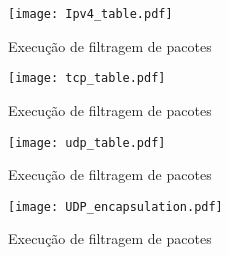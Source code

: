 \begin{figure}[ht]
\centering
\texttt{[image: Ipv4\_table.pdf]}
\caption{Execução de filtragem de pacotes}
\label{fig:run_filter}
\end{figure}


\begin{figure}[ht]
\centering
\texttt{[image: tcp\_table.pdf]}
\caption{Execução de filtragem de pacotes}
\label{fig:run_filter}
\end{figure}

\begin{figure}[ht]
\centering
\texttt{[image: udp\_table.pdf]}
\caption{Execução de filtragem de pacotes}
\label{fig:run_filter}
\end{figure}


\begin{figure}[ht]
\centering
\texttt{[image: UDP\_encapsulation.pdf]}
\caption{Execução de filtragem de pacotes}
\label{fig:run_filter}
\end{figure}









